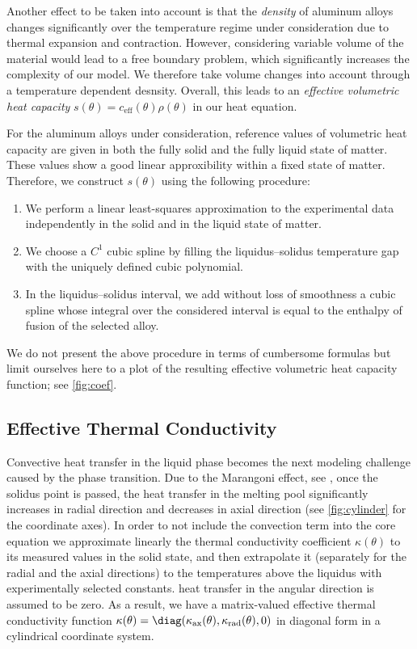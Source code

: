 Another effect to be taken into account is that the \emph{density} of aluminum alloys changes significantly over the temperature regime under consideration due to thermal expansion and contraction.
However, considering variable volume of the material would lead to a free boundary problem, which significantly increases the complexity of our model.
We therefore take volume changes into account through a temperature dependent desnsity.
Overall, this leads to an \emph{effective volumetric heat capacity} $s(\theta) = c_\text{eff}(\theta) \rho(\theta)$ in our heat equation.

For the aluminum alloys under consideration, reference values of volumetric heat capacity are given in both the fully solid and the fully liquid state of matter. 
These values show a good linear approxibility within a fixed state of matter. 
Therefore, we construct $s(\theta)$ using the following procedure:
\begin{enumerate}
	\item 
		We perform a linear least-squares approximation to the experimental data independently in the solid and in the liquid state of matter.
	\item 
		We choose a $C^1$ cubic spline by filling the liquidus--solidus temperature gap with the uniquely defined cubic polynomial.
	\item 
		In the liquidus--solidus interval, we add without loss of smoothness a cubic spline whose integral over the considered interval is equal to the enthalpy of fusion of the selected alloy.
\end{enumerate}

We do not present the above procedure in terms of cumbersome formulas but limit ourselves here to a plot of the resulting effective volumetric heat capacity function; see \cref{fig:coef}.


\subsection{Effective Thermal Conductivity}
\label{subsec:conductivity}

Convective heat transfer in the liquid phase becomes the next modeling challenge caused by the phase transition. 
Due to the Marangoni effect, see \cite{MillsKeeneBrooksShirali:1998:1,Saldi:2012:1}, once the solidus point is passed, the heat transfer in the melting pool significantly increases in radial direction and decreases in axial direction (see \cref{fig:cylinder} for the coordinate axes).
In order to not include the convection term into the core equation we approximate linearly the thermal conductivity coefficient $\kappa(\theta)$ to its measured values in the solid state, and then extrapolate it (separately for the radial and the axial directions) to the temperatures above the liquidus with experimentally selected constants. 
 heat transfer in the angular direction is assumed to be zero.
As a result, we have a matrix-valued effective thermal conductivity function $\kappa(\theta) = \diag(\kappa_\text{ax}(\theta), \kappa_\text{rad}(\theta), 0)$ in diagonal form in a cylindrical coordinate system.


